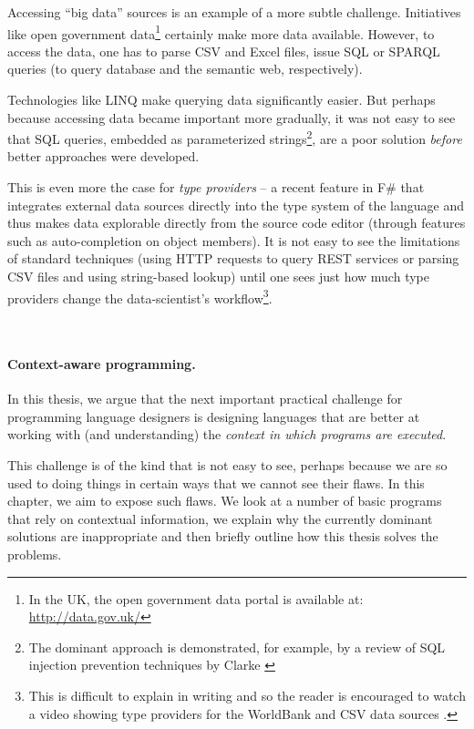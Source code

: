 Accessing ``big data'' sources is an example of a more subtle challenge. Initiatives like open 
government data\footnote{In the UK, the open government data portal is available at: \url{http://data.gov.uk/}}
certainly make more data available. However, to access the data, one has to parse CSV and Excel files,
issue SQL or SPARQL queries (to query database and the semantic web, respectively).

Technologies like LINQ \cite{app-linq} make querying data significantly easier. But perhaps
because accessing data became important more gradually, it was not easy to see that SQL queries,
embedded as parameterized strings\footnote{The dominant approach is demonstrated, for example, 
by a review of SQL injection prevention techniques by Clarke \cite{app-sql-injection}}, are a 
poor solution \emph{before} better approaches were developed.

This is even more the case for \emph{type providers} -- a recent feature in F\# that integrates
external data sources directly into the type system of the language and thus makes data explorable
directly from the source code editor (through features such as auto-completion on object members).
It is not easy to see the limitations of standard techniques (using HTTP requests to query REST
services or parsing CSV files and using string-based lookup) until one sees just how much type 
providers change the data-scientist's workflow\footnote{This is difficult to explain in writing 
and so the reader is encouraged to watch a video showing type providers for the WorldBank and CSV 
data sources \cite{app-fsharp-world}.}.

~\\

\paragraph{Context-aware programming.}

In this thesis, we argue that the next important practical challenge for programming language
designers is designing languages that are better at working with (and understanding) the
\emph{context in which programs are executed}.

This challenge is of the kind that is not easy to see, perhaps because we are so used to
doing things in certain ways that we cannot see their flaws. In this chapter, we aim to
expose such flaws. We look at a number of basic programs that rely on contextual
information, we explain why the currently dominant solutions are inappropriate and then 
briefly outline how this thesis solves the problems.


